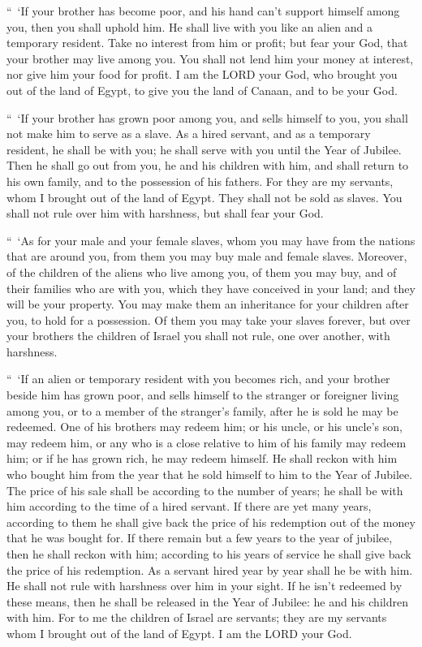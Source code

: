 \myverse{}“ ‘If your brother has become poor, and his hand can’t support
himself among you, then you shall uphold him. He shall live with you like an alien and a temporary resident.
\myverse{}Take no interest from him or profit; but fear your God, that your brother
may live among you.
\myverse{}You shall not lend him your money at interest, nor give him your food for
profit.
\myverse{}I am the LORD your God, who brought you out of the land of Egypt, to give
you the land of Canaan, and to be your God.


\myverse{}“ ‘If your brother has grown poor among you, and sells himself
to you, you shall not make him to serve as a slave.
\myverse{}As a hired servant, and as a temporary resident, he shall be with you; he
shall serve with you until the Year of Jubilee.
\myverse{}Then he shall go out from you, he and his children with him, and shall return
to his own family, and to the possession of his fathers.
\myverse{}For they are my servants, whom I brought out of the land of Egypt. They shall
not be sold as slaves.
\myverse{}You shall not rule over him with harshness, but shall fear your God.


\myverse{}“ ‘As for your male and your female slaves, whom you may have
from the nations that are around you, from them you may buy male and female slaves.
\myverse{}Moreover, of the children of the aliens who live among you, of them you may
buy, and of their families who are with you, which they have conceived in your land; and they will be
your property.
\myverse{}You may make them an inheritance for your children after you, to hold for
a possession. Of them you may take your slaves forever, but over your brothers the children of Israel
you shall not rule, one over another, with harshness.


\myverse{}“ ‘If an alien or temporary resident with you becomes rich, and
your brother beside him has grown poor, and sells himself to the stranger or foreigner living among you,
or to a member of the stranger’s family,
\myverse{}after he is sold he may be redeemed. One of his brothers may redeem him;
\myverse{}or his uncle, or his uncle’s son, may redeem him, or any who is a close relative
to him of his family may redeem him; or if he has grown rich, he may redeem himself.
\myverse{}He shall reckon with him who bought him from the year that he sold himself
to him to the Year of Jubilee. The price of his sale shall be according to the number of years; he shall
be with him according to the time of a hired servant.
\myverse{}If there are yet many years, according to them he shall give back the price
of his redemption out of the money that he was bought for.
\myverse{}If there remain but a few years to the year of jubilee, then he shall reckon
with him; according to his years of service he shall give back the price of his redemption.
\myverse{}As a servant hired year by year shall he be with him. He shall not rule with
harshness over him in your sight.
\myverse{}If he isn’t redeemed by these means, then he shall be released in the Year
of Jubilee: he and his children with him.
\myverse{}For to me the children of Israel are servants; they are my servants whom
I brought out of the land of Egypt. I am the LORD your God.


